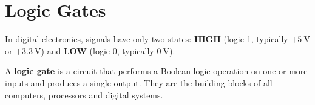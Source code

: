 \section{Logic Gates}

\begin{defbox}
In digital electronics, signals have only two states:
\textbf{HIGH} (logic 1, typically $+5\ \text{V}$ or
$+3.3\ \text{V}$) and \textbf{LOW} (logic 0, typically
$0\ \text{V}$).

A \textbf{logic gate} is a circuit that performs a
Boolean logic operation on one or more inputs and
produces a single output. They are the building
blocks of all computers, processors and digital
systems.
\end{defbox}

